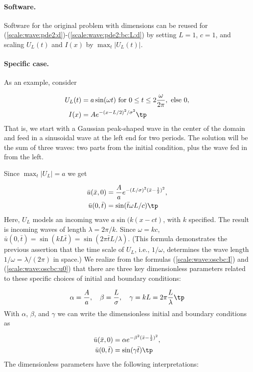 \documentclass[graybox,envcountchap,sectrefs,final]{svmonodo}
\begin{document}
\paragraph{Software.}
Software for the original problem with dimensions can be reused for
(\ref{scale:wave:pde2:d})-(\ref{scale:wave:pde2:bc:L:d}) by
setting $L=1$, $c=1$, and scaling $U_L(t)$ and $I(x)$ by
$\max_t |U_L(t)|$.

\paragraph{Specific case.}
As an example, consider

\begin{align*}
U_L(t) &= a\sin(\omega t)\hbox{ for } 0\leq t\leq 2\frac{\omega}{2\pi},
\hbox{ else } 0,\\ 
I(x)   & = Ae^{-(x-L/2)^2/\sigma^2}\tp
\end{align*}
That is, we start with a Gaussian peak-shaped wave in the center of the
domain and feed in a sinusoidal wave at the left end for two periods.
The solution will be the sum of three waves: two parts from the initial
condition, plus the wave fed in from the left.

Since $\max_t |U_L|=a$ we get

\begin{align}
\bar u(\bar x,0) &= \frac{A}{a}e^{-(L/\sigma)^2(\bar x -\frac{1}{2})^2},
\label{scale:wave:oscbc:I}\\ 
\bar u(0,\bar t) &= \sin(\bar t\omega L/c)\tp
\label{scale:wave:oscbc:u0}
\end{align}
Here, $U_L$ models an incoming wave $a\sin(k(x-ct)$, with $k$ specified.
The result is incoming
waves of length $\lambda = 2\pi/k$. Since $\omega =kc$,
$\bar u(0,\bar t)=\sin(kL\bar t) = \sin(2\pi\bar t L/\lambda)$.
(This formula demonstrates the previous assertion that the time scale
of $U_L$, i.e., $1/\omega$, determines the wave length $1/\omega = \lambda/(2\pi)$ in space.)
We realize from the formulas (\ref{scale:wave:oscbc:I}) and
(\ref{scale:wave:oscbc:u0})
that there are three key dimensionless parameters related
to these specific choices of initial and boundary conditions:

\[ \alpha = \frac{A}{a},\quad\beta = \frac{L}{\sigma},\quad\gamma = kL
=2\pi\frac{L}{\lambda}\tp\]
With $\alpha$, $\beta$, and $\gamma$ we can write the dimensionless
initial and boundary conditions as

\begin{align*}
\bar u(\bar x,0) &= \alpha e^{-\beta^2(\bar x -\frac{1}{2})^2},\\ 
\bar u(0,\bar t) &= \sin(\gamma\bar t)\tp
\end{align*}
The dimensionless parameters have the following interpretations:
\end{document}
